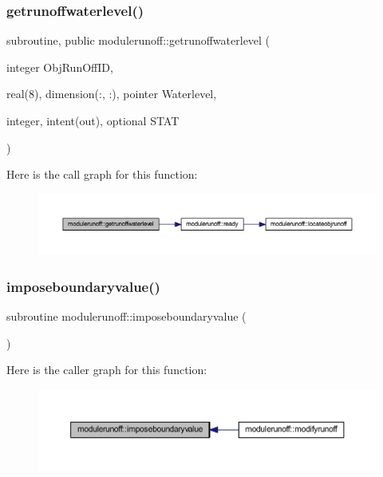 \subsubsection{\texorpdfstring{getrunoffwaterlevel()}{getrunoffwaterlevel()}}
{\footnotesize\ttfamily subroutine, public modulerunoff\+::getrunoffwaterlevel (\begin{DoxyParamCaption}\item[{integer}]{Obj\+Run\+Off\+ID,  }\item[{real(8), dimension(\+:, \+:), pointer}]{Waterlevel,  }\item[{integer, intent(out), optional}]{S\+T\+AT }\end{DoxyParamCaption})}

Here is the call graph for this function\+:\nopagebreak
\begin{figure}[H]
\begin{center}
\leavevmode
\includegraphics[width=350pt]{namespacemodulerunoff_a739d861fb3d51996841a644f1567506e_cgraph}
\end{center}
\end{figure}
\mbox{\label{namespacemodulerunoff_a994fa95e6648fa412fa3e0982c2953e3}} 
\subsubsection{\texorpdfstring{imposeboundaryvalue()}{imposeboundaryvalue()}}
{\footnotesize\ttfamily subroutine modulerunoff\+::imposeboundaryvalue (\begin{DoxyParamCaption}{ }\end{DoxyParamCaption})\hspace{0.3cm}{\ttfamily [private]}}

Here is the caller graph for this function\+:\nopagebreak
\begin{figure}[H]
\begin{center}
\leavevmode
\includegraphics[width=350pt]{namespacemodulerunoff_a994fa95e6648fa412fa3e0982c2953e3_icgraph}
\end{center}
\end{figure}
\mbox{\label{namespacemodulerunoff_acf9771f898b15e849b1eaba077dd0d83}} 
